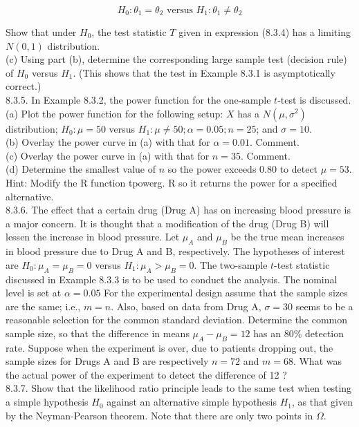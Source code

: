 $$
H_{0}: \theta_{1}=\theta_{2} \text { versus } H_{1}: \theta_{1} \neq \theta_{2}
$$

Show that under $H_{0}$, the test statistic $T$ given in expression (8.3.4) has a limiting $N(0,1)$ distribution.\\
(c) Using part (b), determine the corresponding large sample test (decision rule) of $H_{0}$ versus $H_{1}$. (This shows that the test in Example 8.3.1 is asymptotically correct.)\\
8.3.5. In Example 8.3.2, the power function for the one-sample $t$-test is discussed.\\
(a) Plot the power function for the following setup: $X$ has a $N\left(\mu, \sigma^{2}\right)$ distribution; $H_{0}: \mu=50$ versus $H_{1}: \mu \neq 50 ; \alpha=0.05 ; n=25$; and $\sigma=10$.\\
(b) Overlay the power curve in (a) with that for $\alpha=0.01$. Comment.\\
(c) Overlay the power curve in (a) with that for $n=35$. Comment.\\
(d) Determine the smallest value of $n$ so the power exceeds 0.80 to detect $\mu=53$. Hint: Modify the R function tpowerg. R so it returns the power for a specified alternative.\\
8.3.6. The effect that a certain drug (Drug A) has on increasing blood pressure is a major concern. It is thought that a modification of the drug (Drug B) will lessen the increase in blood pressure. Let $\mu_{A}$ and $\mu_{B}$ be the true mean increases in blood pressure due to Drug A and B, respectively. The hypotheses of interest are $H_{0}: \mu_{A}=\mu_{B}=0$ versus $H_{1}: \mu_{A}>\mu_{B}=0$. The two-sample $t$-test statistic discussed in Example 8.3.3 is to be used to conduct the analysis. The nominal level is set at $\alpha=0.05$ For the experimental design assume that the sample sizes are the same; i.e., $m=n$. Also, based on data from Drug A, $\sigma=30$ seems to be a reasonable selection for the common standard deviation. Determine the common sample size, so that the difference in means $\mu_{A}-\mu_{B}=12$ has an $80 \%$ detection rate. Suppose when the experiment is over, due to patients dropping out, the sample sizes for Drugs A and B are respectively $n=72$ and $m=68$. What was the actual power of the experiment to detect the difference of 12 ?\\
8.3.7. Show that the likelihood ratio principle leads to the same test when testing a simple hypothesis $H_{0}$ against an alternative simple hypothesis $H_{1}$, as that given by the Neyman-Pearson theorem. Note that there are only two points in $\Omega$.\\
